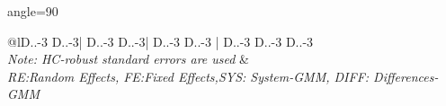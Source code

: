 \begin{table}[H]
\begin{adjustbox}{angle=90}
{\begin{tabular}{@{\extracolsep{10pt}}lD{.}{.}{-3} D{.}{.}{-3}| D{.}{.}{-3} D{.}{.}{-3}| D{.}{.}{-3} D{.}{.}{-3} | D{.}{.}{-3} D{.}{.}{-3} D{.}{.}{-3} }
\hline 
\hline \\[-1.8ex] 
 {\textit{Note: HC-robust standard errors are used}}  &  \\ 
  {\textit{RE:Random Effects, FE:Fixed Effects,SYS: System-GMM, DIFF: Differences-GMM}}  \\ 
  
\end{tabular} 
}
\end{adjustbox}
\end{table} 
